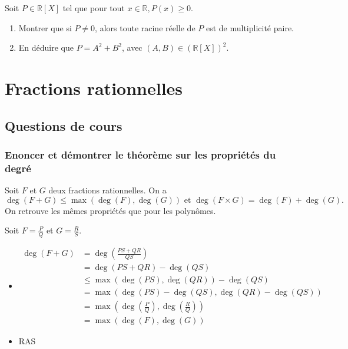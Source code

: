 \documentclass[titlepage, twoside]{report}
\begin{document}
\begin{tcolorbox}[title=Exercice 4, title filled=false, colframe=darkgreen, colback=darkgreen!10!white]
    Soit $P \in \mathbb{R}[X]$ tel que pour tout $x \in \mathbb{R}, P(x) \geq 0$.
    \begin{enumerate}
        \item Montrer que si $P \neq 0$, alors toute racine réelle de $P$ est de multiplicité paire.
        \item En déduire que $P=A^2+B^2$, avec $(A, B) \in(\mathbb{R}[X])^2$.
    \end{enumerate}
\end{tcolorbox}

\section{Fractions rationnelles}
\subsection{Questions de cours}
\subsubsection{Enoncer et démontrer le théorème sur les propriétés du degré}
\begin{tcolorbox}[title=Théorème 17.13, title filled=false, colframe=orange, colback=orange!10!white]
    Soit $F$ et $G$ deux fractions rationnelles. On a
    $$\deg(F + G) \leq \max(\deg(F), \deg(G)) \text{ et } \deg(F \times G) = \deg(F) + \deg(G).$$
    On retrouve les mêmes propriétés que pour les polynômes. 
\end{tcolorbox}

\noindent Soit $F = \frac{P}{Q}$ et $G = \frac{R}{S}$. 
\begin{itemize}
    \item \begin{align*}
        \deg(F + G) &= \deg(\frac{PS + QR}{QS}) \\
        &= \deg(PS + QR) - \deg(QS) \\
        &\leq \max(\deg(PS), \deg(QR)) - \deg(QS) \\
        &= \max(\deg(PS) - \deg(QS), \deg(QR) - \deg(QS)) \\
        &= \max\left(\deg \left(\frac{P}{Q}\right), \deg \left(\frac{R}{Q}\right)\right) \\
        &= \max(\deg(F), \deg(G))
    \end{align*}

    \item RAS
\end{itemize}
\end{document}
